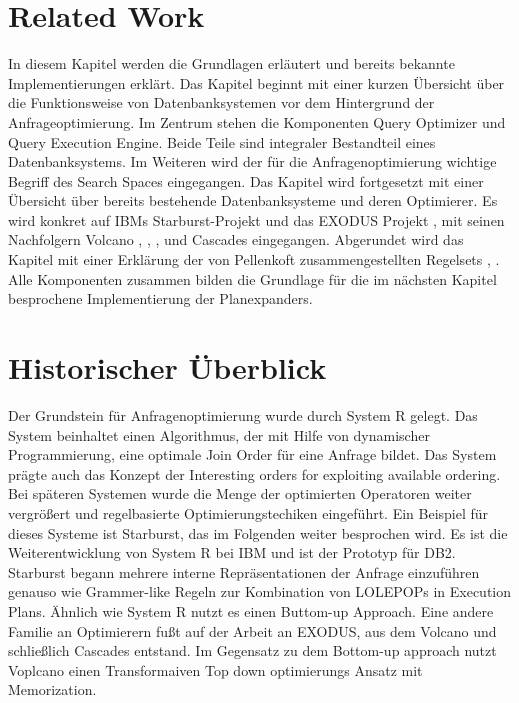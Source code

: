 \section{Related Work}

In diesem Kapitel werden die Grundlagen erläutert und bereits bekannte Implementierungen erklärt.  Das Kapitel beginnt mit einer kurzen Übersicht über die Funktionsweise von Datenbanksystemen vor dem Hintergrund der Anfrageoptimierung. Im Zentrum stehen die Komponenten Query Optimizer und Query Execution Engine. Beide Teile sind integraler Bestandteil eines Datenbanksystems. Im Weiteren wird der für die Anfragenoptimierung wichtige Begriff des Search Spaces eingegangen. Das Kapitel wird fortgesetzt mit einer Übersicht über bereits bestehende Datenbanksysteme und deren Optimierer. Es wird konkret auf IBMs Starburst-Projekt und das EXODUS Projekt \cite{graefe1987exodus}, \cite{carey1990exodus} mit seinen Nachfolgern Volcano \cite{graefe1990parallelizing}, \cite{graefe1990encapsulation}, \cite{graefe1993volcano}, \cite{graefe1994volcano} und Cascades \cite{graefe1995cascades} eingegangen. Abgerundet wird das Kapitel mit einer Erklärung der von Pellenkoft zusammengestellten Regelsets \cite{pellenkoft1997complexity}, \cite{pellenkoft1997duplicate}. Alle Komponenten zusammen bilden die Grundlage für die im nächsten Kapitel besprochene Implementierung der Planexpanders.


\section{Historischer Überblick}
Der Grundstein für Anfragenoptimierung wurde durch System R gelegt. Das System beinhaltet einen Algorithmus, der mit Hilfe von dynamischer Programmierung, eine optimale Join Order für eine Anfrage bildet. Das System prägte auch das Konzept der Interesting orders for exploiting available ordering. Bei späteren Systemen  wurde die Menge der optimierten Operatoren weiter vergrößert und regelbasierte Optimierungstechiken eingeführt. Ein Beispiel für dieses Systeme ist Starburst, das im Folgenden weiter besprochen wird. Es ist die Weiterentwicklung von System R bei IBM und ist der Prototyp für DB2. Starburst begann mehrere interne Repräsentationen der Anfrage einzuführen genauso wie Grammer-like Regeln zur Kombination von LOLEPOPs in Execution Plans. Ähnlich wie System R nutzt es einen Buttom-up Approach. Eine andere Familie an Optimierern fußt auf der Arbeit an EXODUS, aus dem Volcano und schließlich Cascades entstand. Im Gegensatz zu dem Bottom-up approach nutzt Voplcano einen Transformaiven Top down optimierungs Ansatz mit Memorization. 

